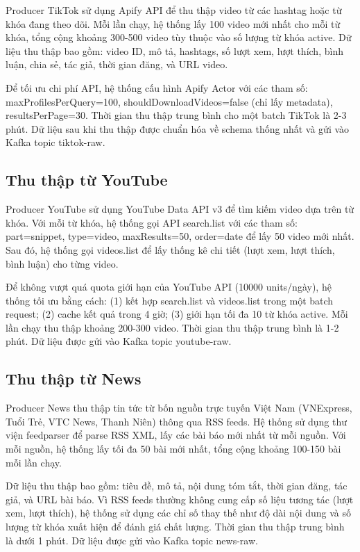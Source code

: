 Producer TikTok sử dụng Apify API để thu thập video từ các hashtag hoặc từ khóa đang theo dõi. Mỗi lần chạy, hệ thống lấy 100 video mới nhất cho mỗi từ khóa, tổng cộng khoảng 300-500 video tùy thuộc vào số lượng từ khóa active. Dữ liệu thu thập bao gồm: video ID, mô tả, hashtags, số lượt xem, lượt thích, bình luận, chia sẻ, tác giả, thời gian đăng, và URL video.

Để tối ưu chi phí API, hệ thống cấu hình Apify Actor với các tham số: maxProfilesPerQuery=100, shouldDownloadVideos=false (chỉ lấy metadata), resultsPerPage=30. Thời gian thu thập trung bình cho một batch TikTok là 2-3 phút. Dữ liệu sau khi thu thập được chuẩn hóa về schema thống nhất và gửi vào Kafka topic tiktok-raw.

\subsection{Thu thập từ YouTube}

Producer YouTube sử dụng YouTube Data API v3 để tìm kiếm video dựa trên từ khóa. Với mỗi từ khóa, hệ thống gọi API search.list với các tham số: part=snippet, type=video, maxResults=50, order=date để lấy 50 video mới nhất. Sau đó, hệ thống gọi videos.list để lấy thống kê chi tiết (lượt xem, lượt thích, bình luận) cho từng video.

Để không vượt quá quota giới hạn của YouTube API (10000 units/ngày), hệ thống tối ưu bằng cách: (1) kết hợp search.list và videos.list trong một batch request; (2) cache kết quả trong 4 giờ; (3) giới hạn tối đa 10 từ khóa active. Mỗi lần chạy thu thập khoảng 200-300 video. Thời gian thu thập trung bình là 1-2 phút. Dữ liệu được gửi vào Kafka topic youtube-raw.

\subsection{Thu thập từ News}

Producer News thu thập tin tức từ bốn nguồn trực tuyến Việt Nam (VNExpress, Tuổi Trẻ, VTC News, Thanh Niên) thông qua RSS feeds. Hệ thống sử dụng thư viện feedparser để parse RSS XML, lấy các bài báo mới nhất từ mỗi nguồn. Với mỗi nguồn, hệ thống lấy tối đa 50 bài mới nhất, tổng cộng khoảng 100-150 bài mỗi lần chạy.

Dữ liệu thu thập bao gồm: tiêu đề, mô tả, nội dung tóm tắt, thời gian đăng, tác giả, và URL bài báo. Vì RSS feeds thường không cung cấp số liệu tương tác (lượt xem, lượt thích), hệ thống sử dụng các chỉ số thay thế như độ dài nội dung và số lượng từ khóa xuất hiện để đánh giá chất lượng. Thời gian thu thập trung bình là dưới 1 phút. Dữ liệu được gửi vào Kafka topic news-raw.

